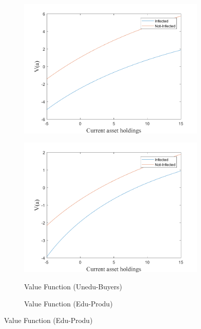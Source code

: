 \begin{figure}[H]
\begin{subfigure}{0.5\textwidth}
   \includegraphics[width=\linewidth,height = 0.22\textheight]{figures/art/FIG13.png}
    \label{fig_dert}
\end{subfigure}
\hspace*{\fill}
\begin{subfigure}{0.5\textwidth}\caption{Value Function (Unedu-Buyers)}
   \includegraphics[width=\linewidth,height = 0.22\textheight]{figures/art/FIG14.png}
    \label{fig:x_b}
\end{subfigure}
\bigskip
\begin{subfigure}{0.5\textwidth}\caption{Value Function (Edu-Produ)}

\end{subfigure}
\end{figure}
